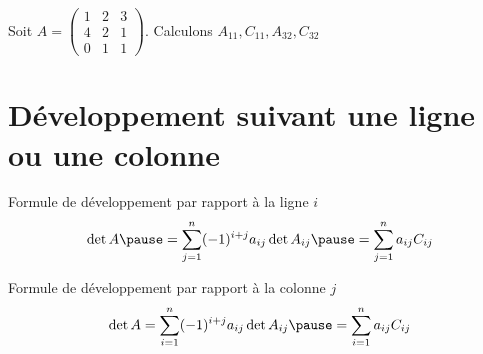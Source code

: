 
\begin{frame}

\begin{exemple}
Soit $ A = 
\begin{pmatrix}
1 & 2 & 3\\
4 & 2 & 1\\
0 & 1 & 1  
\end{pmatrix}$.
Calculons $A_{11}, C_{11}, A_{32}, C_{32}$

\pause 


\pause
{}
\end{exemple} 

\end{frame}


\section{Développement suivant une ligne ou une colonne}

\begin{frame}


\begin{theoreme}
\pause
Formule de développement par rapport à la ligne $i$
$$\det A 
\pause = \sum_{j=1}^n (-1)^{i+j} a_{ij} \det A_{ij}
\pause = \sum_{j=1}^n a_{ij} C_{ij}$$

\pause
Formule de développement par rapport à la colonne $j$
$$\det A 
= \sum_{i=1}^n (-1)^{i+j} a_{ij} \det A_{ij}
\pause = \sum_{i=1}^n a_{ij}C_{ij}$$
\end{theoreme}

\end{frame}

